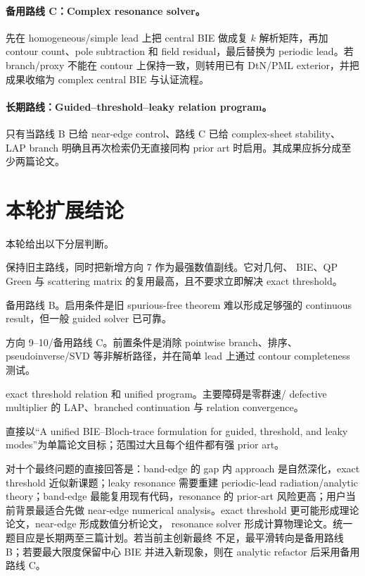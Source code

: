 \documentclass[UTF8,11pt,fontset=none]{ctexart}
\begin{document}
\paragraph{备用路线 C：Complex resonance solver。}
先在 homogeneous/simple lead 上把 central BIE 做成复 \(k\) 解析矩阵，再加 contour
count、pole subtraction 和 field residual，最后替换为 periodic lead。若 branch/proxy
不能在 contour 上保持一致，则转用已有 DtN/PML exterior，并把成果收缩为 complex
central BIE 与认证流程。

\paragraph{长期路线：Guided--threshold--leaky relation program。}
只有当路线 B 已给 near-edge control、路线 C 已给 complex-sheet stability、LAP branch
明确且再次检索仍无直接同构 prior art 时启用。其成果应拆分成至少两篇论文。

\section{本轮扩展结论}

本轮给出以下分层判断。

\begin{description}[style=multiline,leftmargin=3.3cm,labelwidth=3.0cm]
  \item[近期最推荐：] 保持旧主路线，同时把新增方向 7 作为最强数值副线。它对几何、
    BIE、QP Green 与 scattering matrix 的复用最高，且不要求立即解决 exact threshold。
  \item[近期备用：] 备用路线 B。启用条件是旧 spurious-free theorem 难以形成足够强的
    continuous result，但一般 guided solver 已可靠。
  \item[中期扩展：] 方向 9--10/备用路线 C。前置条件是消除 pointwise branch、排序、
    pseudoinverse/SVD 等非解析路径，并在简单 lead 上通过 contour completeness 测试。
  \item[长期方向：] exact threshold relation 和 unified program。主要障碍是零群速/
    defective multiplier 的 LAP、branched continuation 与 relation convergence。
  \item[暂不建议：] 直接以“A unified BIE--Bloch-trace formulation for guided,
    threshold, and leaky modes”为单篇论文目标；范围过大且每个组件都有强 prior art。
\end{description}

对十个最终问题的直接回答是：band-edge 的 gap 内 approach 是自然深化，exact threshold
近似新课题；leaky resonance 需要重建 periodic-lead radiation/analytic theory；band-edge
最能复用现有代码，resonance 的 prior-art 风险更高；用户当前背景最适合先做 near-edge
numerical analysis。exact threshold 更可能形成理论论文，near-edge 形成数值分析论文，
resonance solver 形成计算物理论文。统一题目应是长期两至三篇计划。若当前主创新最终
不足，最平滑转向是备用路线 B；若要最大限度保留中心 BIE 并进入新现象，则在 analytic
refactor 后采用备用路线 C。
\end{document}
